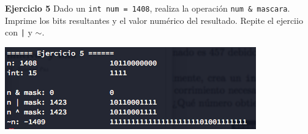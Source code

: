 \documentclass[11pt,letterpaper]{article}
\begin{document}
\textbf{Ejercicio 5} Dado un \texttt{int num = 1408}, realiza la operación \texttt{num \& mascara}.
Imprime los bits resultantes y el valor numérico del resultado. Repite el ejerciio con \texttt{|}
y \texttt{$\sim$}.

    \begin{center}
        \includegraphics[scale=.8]{assets/img/e-5.png}
    \end{center}
\end{document}
